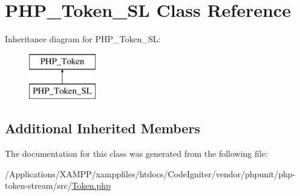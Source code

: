 \hypertarget{class_p_h_p___token___s_l}{}\section{P\+H\+P\+\_\+\+Token\+\_\+\+SL Class Reference}
\label{class_p_h_p___token___s_l}
Inheritance diagram for P\+H\+P\+\_\+\+Token\+\_\+\+SL\+:\begin{figure}[H]
\begin{center}
\leavevmode
\includegraphics[height=2.000000cm]{class_p_h_p___token___s_l}
\end{center}
\end{figure}
\subsection*{Additional Inherited Members}


The documentation for this class was generated from the following file\+:\begin{DoxyCompactItemize}
\item 
/\+Applications/\+X\+A\+M\+P\+P/xamppfiles/htdocs/\+Code\+Igniter/vendor/phpunit/php-\/token-\/stream/src/\mbox{\hyperlink{_token_8php}{Token.\+php}}\end{DoxyCompactItemize}
